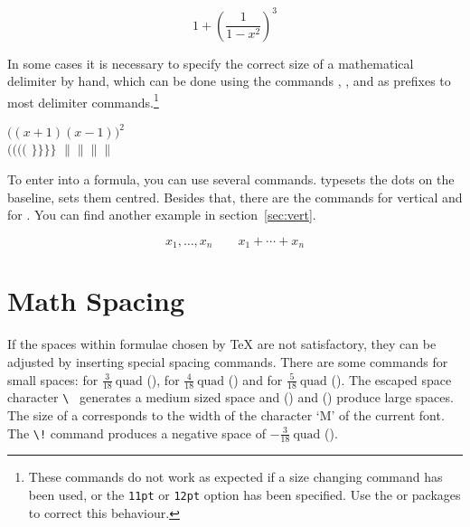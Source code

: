 \begin{example}
\begin{displaymath}
1 + \left( \frac{1}{ 1-x^{2} }
    \right) ^3
\end{displaymath}
\end{example}

In some cases it is necessary to specify the correct size of a
mathematical delimiter by hand,
which can be done using the commands , ,  and
 as prefixes to most delimiter commands.\footnote{These
  commands do not work as expected if a size changing command has been
  used, or the \texttt{11pt} or \texttt{12pt} option has been
  specified.  Use the  or  packages to
  correct this behaviour.}

\begin{example}
$\Big( (x+1) (x-1) \Big) ^{2}$\\
$\big(\Big(\bigg(\Bigg($\quad
$\big\}\Big\}\bigg\}\Bigg\}$\quad
$\big\|\Big\|\bigg\|\Bigg\|$
\end{example}

To enter \textbf{} into a formula, you can use several
commands.  typesets the dots on the baseline, 
sets them centred. Besides that, there are the commands  for
vertical and  for . You can find another example in section~\ref{sec:vert}.

\begin{example}
\begin{displaymath}
x_{1},\ldots,x_{n} \qquad
x_{1}+\cdots+x_{n}
\end{displaymath}
\end{example}
 
\section{Math Spacing}

 If the spaces within formulae chosen by \TeX{}
are not satisfactory, they can be adjusted by inserting special
spacing commands. There are some commands for small spaces: \ci{,} for
$\frac{3}{18}\:\textrm{quad}$ (\demowidth{0.166em}), \ci{:} for $\frac{4}{18}\:
\textrm{quad}$ (\demowidth{0.222em}) and \ci{;} for $\frac{5}{18}\:
\textrm{quad}$ (\demowidth{0.277em}).  The escaped space character
\verb*.\ . generates a medium sized space and 
(\demowidth{1em}) and  (\demowidth{2em}) produce large
spaces. The size of a  corresponds to the width of the
character `M' of the current font.  The \verb|\!| command produces a
negative space of $-\frac{3}{18}\:\textrm{quad}$ (\demowidth{0.166em}).

